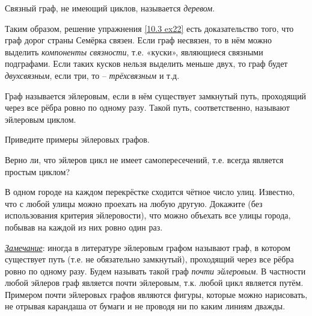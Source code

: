 \begin{dfn}
    Связный граф, не имеющий циклов, называется \textit{деревом}.
\end{dfn}

\noindent Таким образом, решение упражнения \ref{10.3 ex22} есть доказательство того, что граф дорог страны Семёрка связен. Если граф несвязен, то в нём можно выделить \textit{компоненты связности}, т.е. «куски», являющиеся связными подграфами. Если таких кусков нельзя выделить меньше двух, то граф будет \textit{двухсвязным}, если три, то -- \textit{трёхсвязным} и т.д.

\begin{center}
\end{center}

\begin{dfn}
    Граф называется эйлеровым, если в нём существует замкнутый путь, проходящий через все рёбра ровно по одному разу. Такой путь, соответственно, называют эйлеровым циклом.
\end{dfn}

\begin{ex}
    Приведите примеры эйлеровых графов.
\end{ex}

\begin{ques}
    Верно ли, что эйлеров цикл не имеет самопересечений, т.е. всегда является простым циклом?
\end{ques}

\begin{thm}
    В одном городе на каждом перекрёстке сходится чётное число улиц. Известно, что с любой улицы можно проехать на любую другую. Докажите (без использования критерия эйлеровости), что можно объехать все улицы города, побывав на каждой из них ровно один раз.
\end{thm}

\textit{\underline{Замечание}}: иногда в литературе эйлеровым графом называют граф, в котором существует путь (т.е. не обязательно замкнутый), проходящий через все рёбра ровно по одному разу. Будем называть такой граф \textit{почти эйлеровым}. В частности любой эйлеров граф является почти эйлеровым, т.к. любой цикл является путём. Примером почти эйлеровых графов являются фигуры, которые можно нарисовать, не отрывая карандаша от бумаги и не проводя ни по каким линиям дважды.

